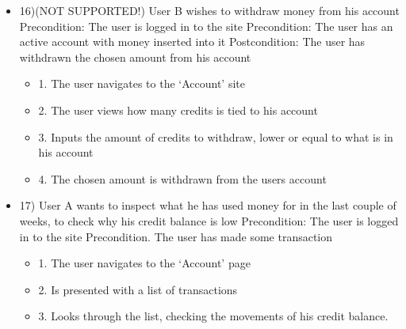 \begin{itemize}
\item 16)(NOT SUPPORTED!)
User B wishes to withdraw money from his account
\newline Precondition: The user is logged in to the site
\newline Precondition: The user has an active account with money inserted into it
\newline Postcondition: The user has withdrawn the chosen amount from his account
\begin{itemize}
    \item 1. The user navigates to the ‘Account’ site
    \item 2. The user views how many credits is tied to his account
    \item 3. Inputs the amount of credits to withdraw, lower or equal to what is in his account
    \item 4. The chosen amount is withdrawn from the users account
\end{itemize}

\item 17)
User A wants to inspect what he has used money for in the last couple of weeks, to check why his credit balance is low
\newline Precondition: The user is logged in to the site
\newline Precondition. The user has made some transaction
\begin{itemize}
    \item 1. The user navigates to the ‘Account’ page
    \item 2. Is presented with a list of transactions
    \item 3. Looks through the list, checking the movements of his credit balance.
\end{itemize}


\end{itemize}
